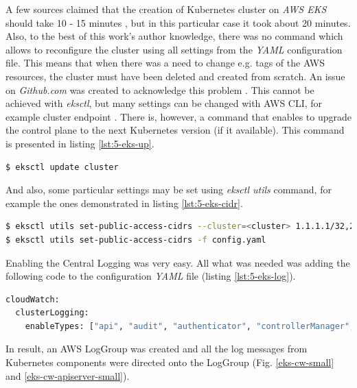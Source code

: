 A few sources claimed that the creation of Kubernetes cluster on \textit{AWS EKS} should take 10 - 15 minutes \cite{eks-blog2,eks-blog-part1}, but in this particular case it took about 20 minutes. Also, to the best of this work’s author knowledge, there was no command which allows to reconfigure the cluster using all settings from the \textit{YAML} configuration file. This means that when there was a need to change e.g. tags of the AWS resources, the cluster must have been deleted and created from scratch. An issue on \textit{Github.com} was created to acknowledge this problem \cite{eksctl-no-config-update}. This cannot be achieved with \textit{eksctl}, but many settings can be changed with AWS CLI, for example cluster endpoint \cite{eks-cluster-endpoint}. There is, however, a command that enables to upgrade the control plane to the next Kubernetes version (if it available). This command is presented in listing \ref{lst:5-eks-up}.
\begin{lstlisting}[basicstyle=\scriptsize,xleftmargin=0cm,label=lst:5-eks-up,caption={Updating \textit{eksctl} cluster},captionpos=b,language=Bash ]
$ eksctl update cluster
\end{lstlisting}
And also, some particular settings may be set using \textit{eksctl utils} command, for example \cite{eksctl-net} the ones demonstrated in listing \ref{lst:5-eks-cidr}.
\begin{lstlisting}[basicstyle=\scriptsize,xleftmargin=0cm,label=lst:5-eks-cidr,caption={Updating \textit{eksctl} cluster configuration},captionpos=b,language=Bash ]
$ eksctl utils set-public-access-cidrs --cluster=<cluster> 1.1.1.1/32,2.2.2.0/24
$ eksctl utils set-public-access-cidrs -f config.yaml
\end{lstlisting}


Enabling the Central Logging was very easy. All what was needed was adding the following code to the configuration \textit{YAML} file (listing \ref{lst:5-eks-log}).
\begin{lstlisting}[basicstyle=\scriptsize,xleftmargin=0cm,label=lst:5-eks-log,caption={Enabling logging in \textit{eksctl} cluster},captionpos=b,language=Bash ]
cloudWatch:
  clusterLogging:
    enableTypes: ["api", "audit", "authenticator", "controllerManager", "scheduler"]
\end{lstlisting}

In result, an AWS LogGroup was created and all the log messages from Kubernetes components were directed onto the LogGroup (Fig. \ref{eks-cw-small} and \ref{eks-cw-apiserver-small}).

